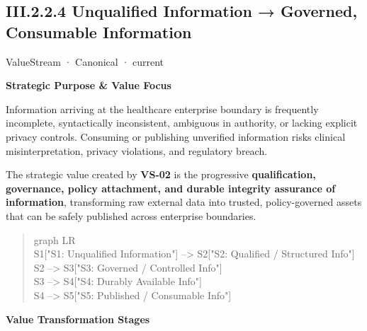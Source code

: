 \subsection*{III.2.2.4 Unqualified Information → Governed, Consumable Information}
\label{navigation:III.2.2.4}

\label{element:02e036f18bab400bac261007e39457ee}
{\small ValueStream · Canonical · current}\par

\par\medskip\textbf{Strategic Purpose \& Value Focus}\par


Information arriving at the healthcare enterprise boundary is frequently incomplete, syntactically inconsistent, ambiguous in authority, or lacking explicit privacy controls. Consuming or publishing unverified information risks clinical misinterpretation, privacy violations, and regulatory breach.



The strategic value created by \textbf{VS-02} is the progressive \textbf{qualification, governance, policy attachment, and durable integrity assurance of information}, transforming raw external data into trusted, policy-governed assets that can be safely published across enterprise boundaries.



\begin{quote}\small\ttfamily
graph LR\\
    S1["S1: Unqualified Information"] --> S2["S2: Qualified / Structured Info"]\\
    S2 --> S3["S3: Governed / Controlled Info"]\\
    S3 --> S4["S4: Durably Available Info"]\\
    S4 --> S5["S5: Published / Consumable Info"]\\

\end{quote}


\par\medskip\textbf{Value Transformation Stages}\par


